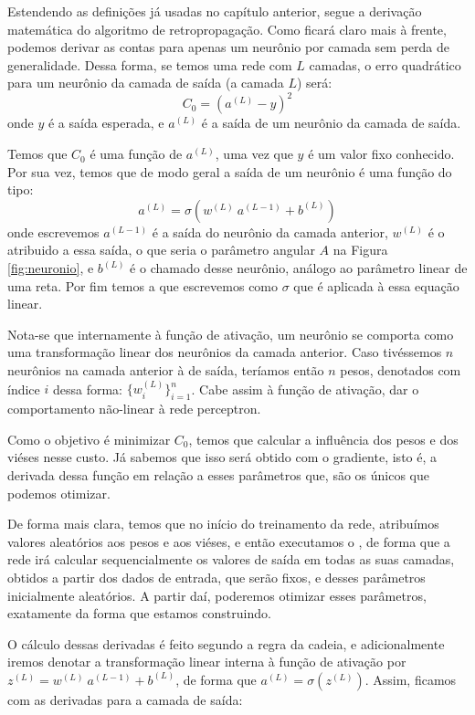 Estendendo as definições já usadas no capítulo anterior, segue a derivação matemática do algoritmo de retropropagação. Como ficará claro mais à frente, podemos derivar as contas para apenas um neurônio por camada sem perda de generalidade. Dessa forma, se temos uma rede com $L$ camadas, o erro quadrático para um neurônio da camada de saída (a camada $L$) será:
\[
C_0 = (a^{(L)} - y)^2
\]
onde $y$ é a saída esperada, e $a^{(L)}$ é a saída de um neurônio da camada de saída.

Temos que $C_0$ é uma função de $a^{(L)}$, uma vez que $y$ é um valor fixo conhecido. Por sua vez, temos que de modo geral a saída de um neurônio é uma função do tipo:
\[
a^{(L)} = \sigma(w^{(L)}~a^{(L-1)} + b^{(L)})
\]
onde escrevemos $a^{(L-1)}$ é a saída do neurônio da camada anterior, $w^{(L)}$ é o  atribuido a essa saída, o que seria o parâmetro angular $A$ na Figura \ref{fig:neuronio}, e $b^{(L)}$ é o chamado  desse neurônio, análogo ao parâmetro linear de uma reta. Por fim temos a  que escrevemos como $\sigma$ que é aplicada à essa equação linear.

Nota-se que internamente à função de ativação, um neurônio se comporta como uma transformação linear dos neurônios da camada anterior. Caso tivéssemos $n$ neurônios na camada anterior à de saída, teríamos então $n$ pesos, denotados com índice $i$ dessa forma: $\{ w_i^{(L)} \}_{i=1}^n$. Cabe assim à função de ativação, dar o comportamento não-linear à rede perceptron.

Como o objetivo é minimizar $C_0$, temos que calcular a influência dos pesos e dos viéses nesse custo. Já sabemos que isso será obtido com o gradiente, isto é, a derivada dessa função em relação a esses parâmetros que, são os únicos que podemos otimizar. 

De forma mais clara, temos que no início do treinamento da rede, atribuímos valores aleatórios aos pesos e aos viéses, e então executamos o , de forma que a rede irá calcular sequencialmente os valores de saída em todas as suas camadas, obtidos a partir dos dados de entrada, que serão fixos, e desses parâmetros inicialmente aleatórios. A partir daí, poderemos otimizar esses parâmetros, exatamente da forma que estamos construindo.

O cálculo dessas derivadas é feito segundo a regra da cadeia, e adicionalmente iremos denotar a transformação linear interna à função de ativação por $z^{(L)} = w^{(L)}~a^{(L-1)} + b^{(L)}$, de forma que $a^{(L)} = \sigma(z^{(L)})$. Assim, ficamos com as derivadas para a camada de saída:

